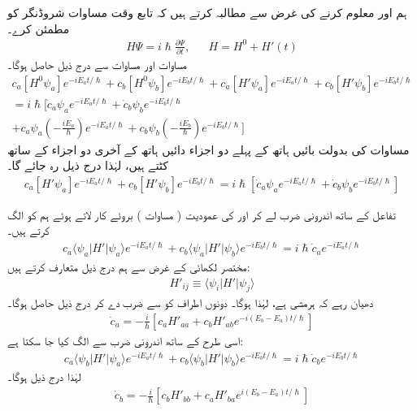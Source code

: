 ہم  اور  معلوم کرنے کی غرض سے مطالبہ کرتے ہیں کہ  تابع وقت مساوات شروڈنگر کو مطمئن کرے۔
\begin{align}\label{مساوات_تابع_مضطرب_مطمئن}
	H\Psi=i\hslash\frac{\partial\Psi}{\partial t},&&H=H^0+H'(t)
\end{align}
مساوات  اور مساوات  سے درج ذیل حاصل ہوگا۔
\begin{multline*}
	c_a[H^0\psi_a]e^{-iE_at/\hslash}+c_b[H^0\psi_b]e^{-iE_bt/\hslash}+c_a[H'\psi_a]e^{-iE_at/\hslash}+c_b[H'\psi_b]e^{-iE_bt/\hslash} \\
	=i\hslash\Big[\dot{c}_a\psi_ae^{-iE_at/\hslash}+\dot{c}_b\psi_be^{-iE_bt/\hslash}\\
	+c_a\psi_a\left(-\frac{iE_a}{\hslash}\right)e^{-iE_at/\hslash}+c_b\psi_b\left(-\frac{iE_b}{\hslash}\right)e^{-iE_bt/\hslash}\Big]
\end{multline*}
مساوات  کی بدولت بائیں ہاتھ کے پہلے دو اجزاء دائیں ہاتھ کے آخری دو اجزاء کے ساتھ کٹتے ہیں، لہٰذا درج ذیل رہ جائے گا۔
\begin{align}
	c_a[H'\psi_a]e^{-iE_at/\hslash}+c_b[H'\psi_b]e^{-iE_bt/\hslash}=i\hslash\left[\dot{c}_a\psi_ae^{-iE_at/\hslash}+\dot{c}_b\psi_be^{-iE_bt/\hslash}\right]
\end{align}

تفاعل  کے ساتھ اندرونی ضرب لے کر  اور  کی عمودیت ( مساوات ) بروئے کار لاتے ہوئے ہم  کو الگ کرتے ہیں۔
\begin{align*}
	c_a\langle\psi_a| H'|\psi_a\rangle e^{-iE_at/\hslash}+c_b\langle\psi_a| H'|\psi_b\rangle e^{-iE_bt/\hslash}=i\hslash\dot{c}_ae^{-iE_at/\hslash}
\end{align*}
مختصر لکھائی کے غرض سے ہم درج ذیل متعارف کرتے ہیں:
\begin{align}
	H'_{ij}\equiv\langle\psi_i| H'|\psi_j\rangle
\end{align}
دھیان رہے کہ  ہرمشی ہے، لہٰذا  ہوگا۔ دونوں اطراف کو  سے ضرب دے کر درج ذیل حاصل ہوگا۔
\begin{align}\label{مساوات_تابع_مضطرب_تحویلی_شرح_الف}
	\dot{c}_a=-\frac{i}{\hslash}\left[c_aH'_{aa}+c_bH'_{ab}e^{-i(E_b-E_a)t/\hslash}\right]
\end{align}
اسی طرح  کے ساتھ اندرونی ضرب سے  الگ کیا جا سکتا ہے:
\begin{align*}
	c_a\langle\psi_b| H'|\psi_a\rangle e^{-iE_at/\hslash}+c_b\langle\psi_b| H'|\psi_b\rangle e^{-iE_bt/\hslash}=i\hslash\dot{c}_be^{-iE_bt/\hslash}
\end{align*}
لہٰذا درج ذیل ہوگا۔
\begin{align}\label{مساوات_تابع_مضطرب_تحویلی_شرح_ب}
	\dot{c}_b=-\frac{i}{\hslash}\left[c_bH'_{bb}+c_aH'_{ba}e^{i(E_b-E_a)t/\hslash}\right]
\end{align}

